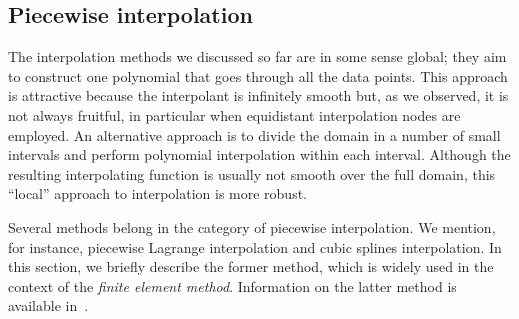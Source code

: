 \subsection{Piecewise interpolation}
\label{sub:piecewise_interpolation}
The interpolation methods we discussed so far are in some sense global;
they aim to construct one polynomial that goes through all the data points.
This approach is attractive because the interpolant is infinitely smooth but,
as we observed, it is not always fruitful,
in particular when equidistant interpolation nodes are employed.
An alternative approach is to divide the domain in a number of small intervals
and perform polynomial interpolation within each interval.
Although the resulting interpolating function is usually not smooth over the full domain,
this ``local'' approach to interpolation is more robust.

Several methods belong in the category of piecewise interpolation.
We mention, for instance, piecewise Lagrange interpolation and cubic splines interpolation.
In this section,
we briefly describe the former method,
which is widely used in the context of the \emph{finite element method}.
Information on the latter method is available in~\cite[Section 8.7.1.]{MR2265914}.

